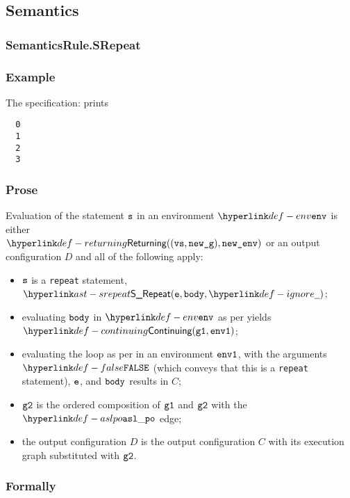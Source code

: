\subsection{Semantics}
\subsubsection{SemanticsRule.SRepeat \label{sec:SemanticsRule.SRepeat}}
\subsubsection{Example}
The specification:
prints
\begin{Verbatim}
  0
  1
  2
  3
\end{Verbatim}

\subsubsection{Prose}
Evaluation of the statement $\vs$ in an environment $\env$ is
either \\ $\Returning((\vvs, \newg), \newenv)$ or an output configuration $D$ and all of the following apply:
\begin{itemize}
  \item $\vs$ is a \texttt{repeat} statement, $\SRepeat(\ve, \vbody, \Ignore)$;
  \item evaluating $\vbody$ in $\env$ as per 
        yields $\Continuing(\vgone, \envone)$\ProseTerminateAs{\ReturningConfig,\ThrowingConfig,\DynErrorConfig};
  \item evaluating the loop as per  in an environment $\envone$,
        with the arguments $\False$ (which conveys that this is a \texttt{repeat} statement), $\ve$, and $\vbody$
        results in $C$;
  \item $\vgtwo$ is the ordered composition of $\vgone$ and $\vgtwo$ with the $\aslpo$ edge;
  \item the output configuration $D$ is the output configuration $C$ with its execution graph
        substituted with $\vgtwo$.
\end{itemize}
\subsubsection{Formally}
\begin{mathpar}
\end{mathpar}

